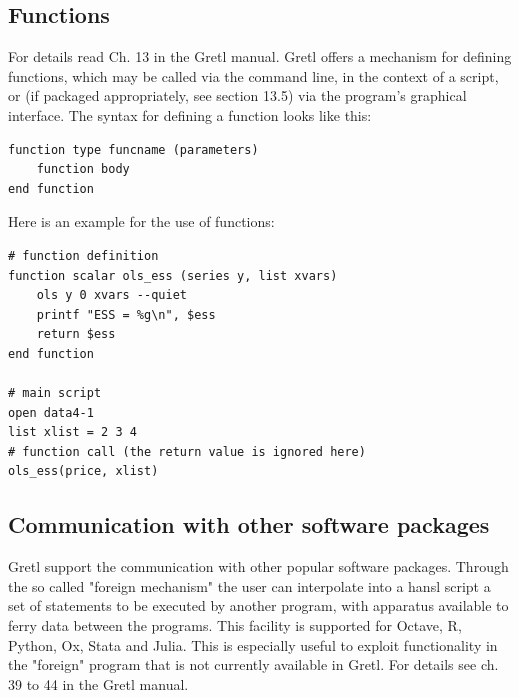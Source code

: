 \documentclass[11pt]{article}
\begin{document}
\subsection{Functions}
For details read Ch. 13 in the Gretl manual. Gretl offers a mechanism for defining functions, which may be called via the command line, in the context of a script, or (if packaged appropriately, see section 13.5) via the program’s graphical interface. The syntax for defining a function looks like this:
\begin{Verbatim}[baselinestretch=0.75, fontsize=\small]
function type funcname (parameters)
	function body
end function
\end{Verbatim}

Here is an example for the use of functions:
\begin{Verbatim}[baselinestretch=0.75, fontsize=\small]
# function definition
function scalar ols_ess (series y, list xvars)
	ols y 0 xvars --quiet
	printf "ESS = %g\n", $ess
	return $ess
end function

# main script
open data4-1
list xlist = 2 3 4
# function call (the return value is ignored here)
ols_ess(price, xlist)
\end{Verbatim}


\subsection{Communication with other software packages}
\label{sec:foreign}
Gretl support the communication with other popular software packages. Through the so called "foreign mechanism" the user can interpolate into a hansl script a set of statements to be executed by another program, with apparatus available to ferry data between the programs. This facility is supported for Octave, R, Python, Ox, Stata and Julia. This is especially useful to exploit functionality in the "foreign" program that is not currently available in Gretl. For details see ch. 39 to 44 in the Gretl manual.
\end{document}

